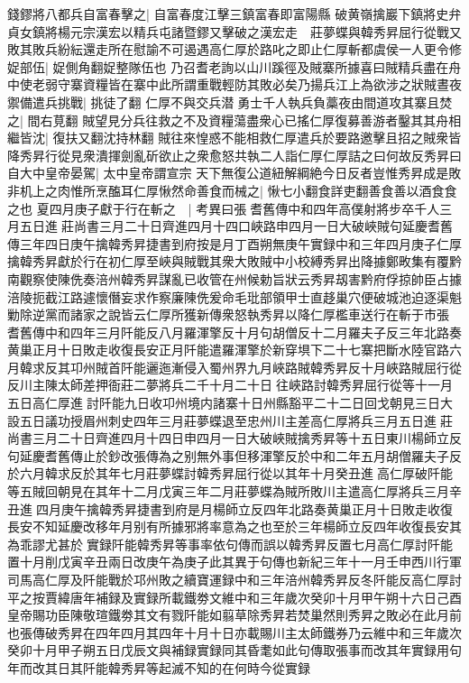 錢鏐將八都兵自富春擊之|{
	自富春度江擊三鎮富春即富陽縣}
破黄嶺擒巖下鎮將史弁貞女鎮將楊元宗漢宏以精兵屯諸暨鏐又擊破之漢宏走　莊夢蝶與韓秀昇屈行從戰又敗其敗兵紛紜還走所在慰諭不可遏遇高仁厚於路叱之即止仁厚斬都虞侯一人更令修娖部伍|{
	娖側角翻娖整隊伍也}
乃召耆老詢以山川蹊徑及賊寨所據喜曰賊精兵盡在舟中使老弱守寨資糧皆在寨中此所謂重戰輕防其敗必矣乃揚兵江上為欲涉之狀賊晝夜禦備遣兵挑戰|{
	挑徒了翻}
仁厚不與交兵潜勇士千人執兵負藁夜由間道攻其寨且焚之|{
	間右莧翻}
賊望見分兵往救之不及資糧蕩盡衆心已搖仁厚復募善游者鑿其其舟相繼皆沈|{
	復扶又翻沈持林翻}
賊往來惶惑不能相救仁厚遣兵於要路邀擊且招之賊衆皆降秀昇行從見衆潰揮劍亂斫欲止之衆愈怒共執二人詣仁厚仁厚詰之曰何故反秀昇曰自大中皇帝晏駕|{
	太中皇帝謂宣宗}
天下無復公道紐解綱絶今日反者豈惟秀昇成是敗非机上之肉惟所烹醢耳仁厚愀然命善食而械之|{
	愀七小翻食詳吏翻善食善以酒食食之也}
夏四月庚子獻于行在斬之　|{
	考異曰張耆舊傳中和四年高僕射將步卒千人三月五日進莊尚書三月二十日齊進四月十四口峽路申四月一日大破峽賊句延慶耆舊傳三年四日庚午擒韓秀昇捷書到府按是月丁酉朔無庚午實録中和三年四月庚子仁厚擒韓秀昇獻於行在初仁厚至峽與賊戰其衆大敗賊中小校縛秀昇出降據鄭畋集有覆黔南觀察使陳侁奏涪州韓秀昇謀亂已收管在州候勅旨狀云秀昇刼害黔府俘掠帥臣占據涪陵扼截江路遽懷僭妄求作察廉陳侁爰命毛玭部領甲士直趍巢穴便破城池迫逐渠魁勦除逆黨而諸家之說皆云仁厚所獲新傳衆怒執秀昇以降仁厚檻車送行在斬于市張耆舊傳中和四年三月阡能反八月羅渾擎反十月句胡僧反十二月羅夫子反三年北路奏黄巢正月十日敗走收復長安正月阡能遣羅渾擎於新穿埧下二十七寨把斷水陸官路六月韓求反其卭州賊首阡能邐迤漸侵入蜀州界九月峽路賊韓秀昇反十月峽路賊屈行從反川主陳太師差押衙莊二夢將兵二千十月二十日往峽路討韓秀昇屈行從等十一月五日高仁厚進討阡能九日收卭州境内諸寨十日州縣豁平二十二日回戈朝見三日大設五日議功授眉州刺史四年三月莊夢蝶退至忠州川主差高仁厚將兵三月五日進莊尚書三月二十日齊進四月十四日申四月一日大破峽賊擒秀昇等十五日東川楊師立反句延慶耆舊傳止於鈔改張傳為之别無外事但移渾擎反於中和二年五月胡僧羅夫子反於六月韓求反於其年七月莊夢蝶討韓秀昇屈行從以其年十月癸丑進高仁厚破阡能等五賊回朝見在其年十二月戊寅三年二月莊夢蝶為賊所敗川主遣高仁厚將兵三月辛丑進四月庚午擒韓秀昇捷書到府是月楊師立反四年北路奏黄巢正月十日敗走收復長安不知延慶改移年月别有所據邪將率意為之也至於三年楊師立反四年收復長安其為乖謬尤甚於實録阡能韓秀昇等事率依句傳而誤以韓秀昇反置七月高仁厚討阡能置十月削戊寅辛丑兩日改庚午為庚子此其異于句傳也新紀三年十一月壬申西川行軍司馬高仁厚及阡能戰於邛州敗之續寶運録中和三年涪州韓秀昇反冬阡能反高仁厚討平之按賈緯唐年補録及實録所載鐵劵文維中和三年歲次癸卯十月甲午朔十六日己酉皇帝賜功臣陳敬瑄鐵劵其文有戮阡能如翦草除秀昇若焚巢然則秀昇之敗必在此月前也張傳破秀昇在四年四月其四年十月十日亦載賜川主太師鐵券乃云維中和三年歲次癸卯十月甲子朔五日戊辰文與補録實録同其昏耄如此句傳取張事而改其年實録用句年而改其日其阡能韓秀昇等起滅不知的在何時今從實録}
